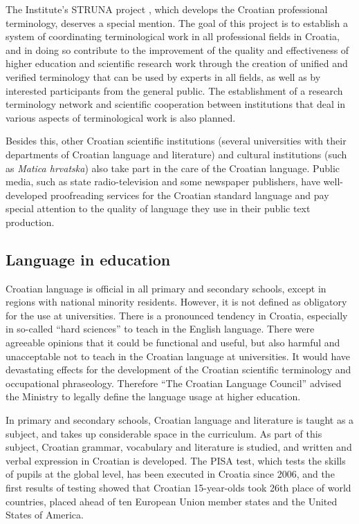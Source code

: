 \begin{multicols}{2}
The Institute’s STRUNA project \cite{str9},  which develops the Croatian professional terminology, deserves a special mention. The goal of this project is to establish a system of coordinating terminological work in all professional fields in Croatia, and in doing so contribute to the improvement of the quality and effectiveness of higher education and scientific research work through the creation of unified and verified terminology that can be used by experts in all fields, as well as by interested participants from the general public. The establishment of a research terminology network and scientific cooperation between institutions that deal in various aspects of terminological work is also planned.


Besides this, other Croatian scientific institutions (several universities with their departments of Croatian language and literature) and cultural institutions (such as \emph{Matica hrvatska}) also take part in the care of the Croatian language. Public media, such as state radio-television and some newspaper publishers, have well-developed proofreading services for the Croatian standard language and pay special attention to the quality of language they use in their public text production.

\subsection{Language in education}

Croatian language is official in all primary and secondary schools, except in regions with national minority residents. However, it is not defined as obligatory for the use at universities. There is a pronounced tendency in Croatia, especially in so-called “hard sciences” to teach in the English language. There were agreeable opinions that it could be functional and useful, but also harmful and unacceptable not to teach in the Croatian language at universities. It would have devastating effects for the development of the Croatian scientific terminology and occupational phraseology. Therefore “The Croatian Language Council” advised the Ministry to legally define the language usage at higher education.

In primary and secondary schools, Croatian language and literature is taught as a subject, and takes up considerable space in the curriculum. As part of this subject, Croatian grammar, vocabulary and literature is studied, and written and verbal expression in Croatian is developed. The PISA test, which tests the skills of pupils at the global level, has been executed in Croatia since 2006, and the first results of testing showed that Croatian 15-year-olds took 26th place of world countries, placed ahead of ten European Union member states and the United States of America.


\end{multicols}
